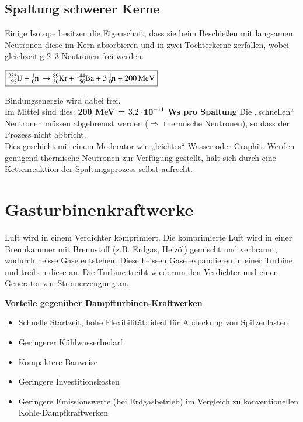 \subsection{Spaltung schwerer Kerne}
    \begin{outline}
        \1 Einige Isotope besitzen die Eigenschaft, dass sie beim Beschießen mit langsamen Neutronen diese im Kern absorbieren und in zwei Tochterkerne zerfallen, wobei gleichzeitig 2–3 Neutronen frei werden.

        \vspace{0.1cm}

        $\boxed{
        \ce{^{235}_{92}U + ^{1}_{0}n \rightarrow  ^{89}_{36}Kr + ^{144}_{56}Ba + 3 ^{1}_{0}n + 200MeV}
        }$

        \vspace{0.1cm}

        \1 Bindungsenergie wird dabei frei.\\
            Im Mittel sind dies: \textbf{200 MeV = $\bm{3.2} \cdot \bm{10^{-11}}$ Ws pro Spaltung}
        \1 Die „schnellen“ Neutronen müssen abgebremst werden ($\Rightarrow$  thermische Neutronen), so dass der Prozess nicht abbricht.\\
        Dies geschieht mit einem Moderator wie „leichtes“ Wasser oder Graphit.
        \1 Werden genügend thermische Neutronen zur Verfügung gestellt, hält sich durch eine Kettenreaktion der Spaltungsprozess selbst aufrecht.
    \end{outline}

\section{Gasturbinenkraftwerke}
    Luft wird in einem Verdichter komprimiert. 
    Die komprimierte Luft wird in einer Brennkammer mit Brennstoff (z.B. Erdgas, Heizöl) gemischt und verbrannt, wodurch heisse Gase entstehen. 
    Diese heissen Gase expandieren in einer Turbine und treiben diese an. 
    Die Turbine treibt wiederum den Verdichter und einen Generator zur Stromerzeugung an.

    \textbf{Vorteile gegenüber Dampfturbinen-Kraftwerken}

    \begin{itemize}
        \item Schnelle Startzeit, hohe Flexibilität: ideal für Abdeckung von Spitzenlasten 
        \item Geringerer Kühlwasserbedarf
        \item Kompaktere Bauweise
        \item Geringere Investitionskosten
        \item Geringere Emissionswerte (bei Erdgasbetrieb) im Vergleich zu konventionellen Kohle-Dampfkraftwerken
    \end{itemize}

